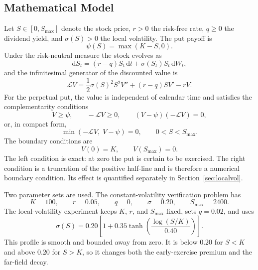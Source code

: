 \documentclass[11pt,a4paper]{article}
\theoremstyle{definition}
\theoremstyle{remark}
\begin{document}
\subsection{Mathematical Model}
Let $S\in[0,S_{\max}]$ denote the stock price, $r>0$ the risk-free rate,
$q\ge0$ the dividend yield, and $\sigma(S)>0$ the local volatility. The put
payoff is
\begin{equation}
    \psi(S)=\max(K-S,0).
    \label{eq:payoff}
\end{equation}
Under the risk-neutral measure the stock evolves as
\begin{equation}
    \mathrm{d}S_t=(r-q)S_t\,\mathrm{d}t+\sigma(S_t)S_t\,\mathrm{d}W_t,
    \label{eq:sde}
\end{equation}
and the infinitesimal generator of the discounted value is
\begin{equation}
    \mathcal{L}V
    =\frac12\sigma(S)^2S^2V''+(r-q)SV'-rV.
    \label{eq:operator}
\end{equation}
For the perpetual put, the value is independent of calendar time and satisfies
the complementarity conditions
\begin{equation}
    V\ge\psi,
    \qquad
    -\mathcal{L}V\ge0,
    \qquad
    (V-\psi)(-\mathcal{L}V)=0,
    \label{eq:complementarity}
\end{equation}
or, in compact form,
\begin{equation}
    \min\left(-\mathcal{L}V,\;V-\psi\right)=0,
    \qquad 0<S<S_{\max}.
    \label{eq:lcp}
\end{equation}
The boundary conditions are
\begin{equation}
    V(0)=K,
    \qquad
    V(S_{\max})=0.
    \label{eq:boundaries}
\end{equation}
The left condition is exact: at zero the put is certain to be exercised. The
right condition is a truncation of the positive half-line and is therefore a
numerical boundary condition. Its effect is quantified separately in
Section~\ref{sec:localvol}.

Two parameter sets are used. The constant-volatility verification problem has
\begin{equation}
    K=100,
    \qquad r=0.05,
    \qquad q=0,
    \qquad \sigma=0.20,
    \qquad S_{\max}=2400.
    \label{eq:parameters-stage1}
\end{equation}
The local-volatility experiment keeps $K$, $r$, and $S_{\max}$ fixed, sets
$q=0.02$, and uses
\begin{equation}
    \sigma(S)=0.20\left[
    1+0.35\tanh\left(\frac{\log(S/K)}{0.40}\right)\right].
    \label{eq:localvol}
\end{equation}
This profile is smooth and bounded away from zero. It is below $0.20$ for
$S<K$ and above $0.20$ for $S>K$, so it changes both the early-exercise
premium and the far-field decay.
\end{document}

